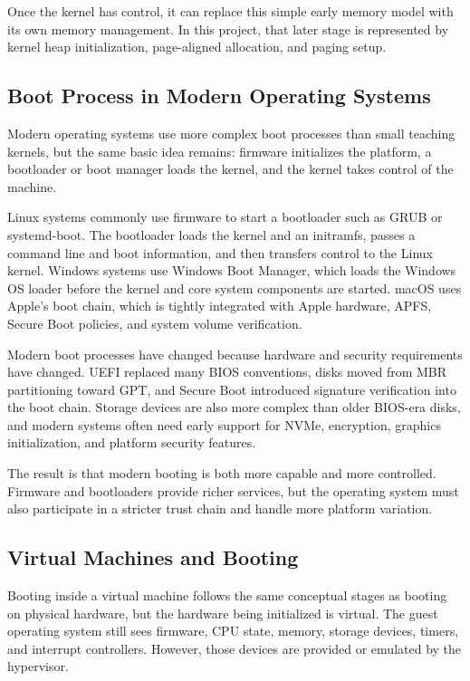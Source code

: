 Once the kernel has control, it can replace this simple early memory model with its own memory management. In this project, that later stage is represented by kernel heap initialization, page-aligned allocation, and paging setup.

\subsection{Boot Process in Modern Operating Systems}
Modern operating systems use more complex boot processes than small teaching kernels, but the same basic idea remains: firmware initializes the platform, a bootloader or boot manager loads the kernel, and the kernel takes control of the machine.

Linux systems commonly use firmware to start a bootloader such as GRUB or systemd-boot. The bootloader loads the kernel and an initramfs, passes a command line and boot information, and then transfers control to the Linux kernel. Windows systems use Windows Boot Manager, which loads the Windows OS loader before the kernel and core system components are started. macOS uses Apple's boot chain, which is tightly integrated with Apple hardware, APFS, Secure Boot policies, and system volume verification.

Modern boot processes have changed because hardware and security requirements have changed. UEFI replaced many BIOS conventions, disks moved from MBR partitioning toward GPT, and Secure Boot introduced signature verification into the boot chain. Storage devices are also more complex than older BIOS-era disks, and modern systems often need early support for NVMe, encryption, graphics initialization, and platform security features.

The result is that modern booting is both more capable and more controlled. Firmware and bootloaders provide richer services, but the operating system must also participate in a stricter trust chain and handle more platform variation.

\subsection{Virtual Machines and Booting}
Booting inside a virtual machine follows the same conceptual stages as booting on physical hardware, but the hardware being initialized is virtual. The guest operating system still sees firmware, CPU state, memory, storage devices, timers, and interrupt controllers. However, those devices are provided or emulated by the hypervisor.

